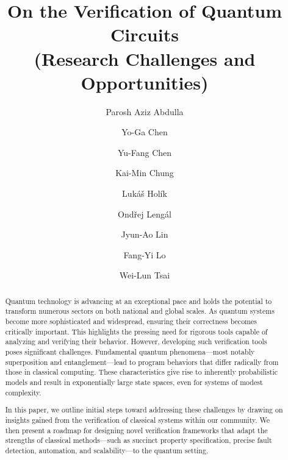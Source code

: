 

\title{On the Verification of Quantum Circuits\\
(Research Challenges and Opportunities) }

\author{
Parosh Aziz Abdulla
\and
Yo-Ga Chen
\and
Yu-Fang Chen
\and
Kai-Min Chung
\and
Luk\'a\v{s} Hol\'ik
\and
{Ond\v{r}ej Leng\'{a}l} 
\and 
Jyun-Ao Lin
\and
Fang-Yi Lo
\and
Wei-Lun Tsai
}

\maketitle
\begin{abstract}
Quantum technology is advancing at an exceptional pace and holds the potential to transform numerous sectors on both national and global scales. 
As quantum systems become more sophisticated and widespread, ensuring their correctness becomes critically important. This highlights the pressing need for rigorous tools capable of analyzing and verifying their behavior.
However, developing such verification tools poses significant challenges. Fundamental quantum phenomena—most notably superposition and entanglement—lead to program behaviors that differ radically from those in classical computing. These characteristics give rise to inherently probabilistic models and result in exponentially large state spaces, even for systems of modest complexity.
 

In this paper, we outline initial steps toward addressing these challenges by drawing on insights gained from the verification of classical systems within our community.
% 
We then present a roadmap for designing novel verification frameworks that adapt the strengths of classical methods—such as succinct property specification, precise fault detection, automation, and scalability—to the quantum setting.
 
\end{abstract}

